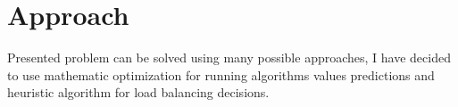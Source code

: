 \chapter{Approach}\label{ch:approach}
Presented problem can be solved using many possible approaches,
I have decided to use mathematic optimization for running algorithms values predictions
and heuristic algorithm for load balancing decisions.





